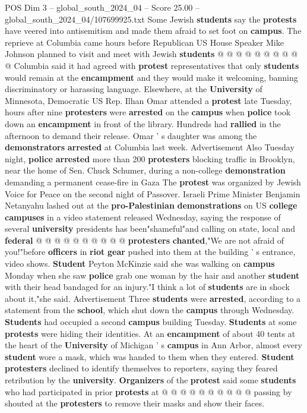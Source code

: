 \begin{textsample}{POS Dim 3 – global\_south\_2024\_04 – Score 25.00 – global\_south\_2024\_04/107699925.txt}
Some Jewish \textbf{students} say the \textbf{protests} have veered into antisemitism and made them afraid to set foot on \textbf{campus}.
The reprieve at Columbia came hours before Republican US House Speaker Mike Johnson planned to visit and meet with Jewish \textbf{students} @ @ @ @ @ @ @ @ @ @ Columbia said it had agreed with \textbf{protest} representatives that only \textbf{students} would remain at the \textbf{encampment} and they would make it welcoming, banning discriminatory or harassing language.
Elsewhere, at the \textbf{University} of Minnesota, Democratic US Rep.
Ilhan Omar attended a \textbf{protest} late Tuesday, hours after nine \textbf{protesters} were \textbf{arrested} on the \textbf{campus} when \textbf{police} took down an \textbf{encampment} in front of the library.
Hundreds had \textbf{rallied} in the afternoon to demand their release.
Omar ' s daughter was among the \textbf{demonstrators} \textbf{arrested} at Columbia last week.
Advertisement Also Tuesday night, \textbf{police} \textbf{arrested} more than 200 \textbf{protesters} blocking traffic in Brooklyn, near the home of Sen.
Chuck Schumer, during a non-college \textbf{demonstration} demanding a permanent cease-fire in Gaza The \textbf{protest} was organized by Jewish Voice for Peace on the second night of Passover.
Israeli Prime Minister Benjamin Netanyahu lashed out at the \textbf{pro-Palestinian} \textbf{demonstrations} on US \textbf{college} \textbf{campuses} in a video statement released Wednesday, saying the response of several \textbf{university} presidents has been"shameful"and calling on state, local and \textbf{federal} @ @ @ @ @ @ @ @ @ @ \textbf{protesters} \textbf{chanted},"We are not afraid of you!"before \textbf{officers} in \textbf{riot} \textbf{gear} pushed into them at the building ' s entrance, video shows. \textbf{Student} Peyton McKinzie said she was walking on \textbf{campus} Monday when she saw \textbf{police} grab one woman by the hair and another \textbf{student} with their head bandaged for an injury."I think a lot of \textbf{students} are in shock about it,"she said.
Advertisement Three \textbf{students} were \textbf{arrested}, according to a statement from the \textbf{school}, which shut down the \textbf{campus} through Wednesday. \textbf{Students} had occupied a second \textbf{campus} building Tuesday. \textbf{Students} at some \textbf{protests} were hiding their identities.
At an \textbf{encampment} of about 40 tents at the heart of the \textbf{University} of Michigan ' s \textbf{campus} in Ann Arbor, almost every \textbf{student} wore a mask, which was handed to them when they entered. \textbf{Student} \textbf{protesters} declined to identify themselves to reporters, saying they feared retribution by the \textbf{university}. \textbf{Organizers} of the \textbf{protest} said some \textbf{students} who had participated in prior \textbf{protests} at @ @ @ @ @ @ @ @ @ @ passing by shouted at the \textbf{protesters} to remove their masks and show their faces.

\end{textsample}
